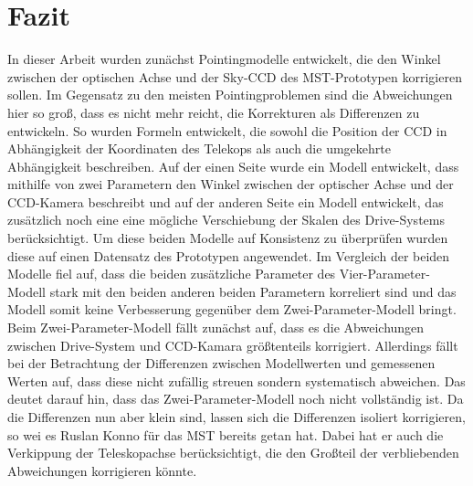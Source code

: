 \chapter{Fazit}
In dieser Arbeit wurden zunächst Pointingmodelle entwickelt, die den Winkel zwischen der optischen Achse und der Sky-CCD des MST-Prototypen korrigieren sollen. Im Gegensatz zu den meisten Pointingproblemen sind die Abweichungen hier so groß, dass es nicht mehr reicht, die Korrekturen als Differenzen zu entwickeln. So wurden Formeln entwickelt, die sowohl die Position der CCD in Abhängigkeit der Koordinaten des Telekops als auch die umgekehrte Abhängigkeit beschreiben. Auf der einen Seite wurde ein Modell entwickelt, dass mithilfe von zwei Parametern den Winkel zwischen der optischer Achse und der CCD-Kamera beschreibt und auf der anderen Seite ein Modell entwickelt, das zusätzlich noch eine eine mögliche Verschiebung der Skalen des Drive-Systems berücksichtigt. Um diese beiden Modelle auf Konsistenz zu überprüfen wurden diese auf einen Datensatz des Prototypen angewendet. Im Vergleich der beiden Modelle fiel auf, dass die beiden zusätzliche Parameter des Vier-Parameter-Modell stark mit den beiden anderen beiden Parametern korreliert sind und das Modell somit keine Verbesserung gegenüber dem Zwei-Parameter-Modell bringt. Beim Zwei-Parameter-Modell fällt zunächst auf, dass es die Abweichungen zwischen Drive-System und CCD-Kamara größtenteils korrigiert. Allerdings fällt bei der Betrachtung der Differenzen zwischen Modellwerten und gemessenen Werten auf, dass diese nicht zufällig streuen sondern systematisch abweichen. Das deutet darauf hin, dass das Zwei-Parameter-Modell noch nicht vollständig ist. Da die Differenzen nun aber klein sind, lassen sich die Differenzen isoliert korrigieren, so wei es Ruslan Konno \cite{Ruslan} für das MST bereits getan hat. Dabei hat er auch die Verkippung der Teleskopachse berücksichtigt, die den Großteil der verbliebenden Abweichungen korrigieren könnte.